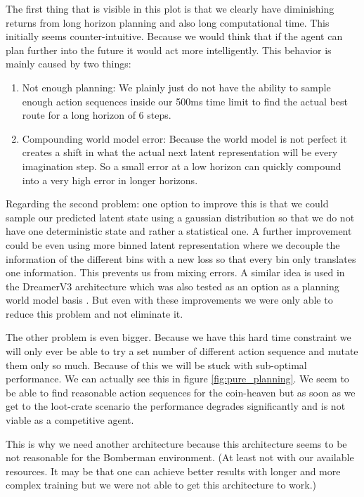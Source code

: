 The first thing that is visible in this plot is that we clearly have diminishing returns from long horizon planning and also long computational time. This initially seems counter-intuitive. Because we would think that if the agent can plan further into the future it would act more intelligently. 
This behavior is mainly caused by two things: 

\begin{enumerate}
    \item Not enough planning: We plainly just do not have the ability to sample enough action sequences inside our 500ms time limit to find the actual best route for a long horizon of 6 steps.
    \item Compounding world model error: Because the world model is not perfect it creates a shift in what the actual next latent representation will be every imagination step. So a small error at a low horizon can quickly compound into a very high error in longer horizons.
\end{enumerate}

Regarding the second problem: one option to improve this is that we could sample our predicted latent state using a gaussian distribution so that we do not have one deterministic state and rather a statistical one. A further improvement could be even using more binned latent representation where we decouple the information of the different bins with a new loss so that every bin only translates one information. This prevents us from mixing errors. A similar idea is used in the DreamerV3 architecture which was also tested as an option as a planning world model basis \cite{hafner2023dreamerv3}. But even with these improvements we were only able to reduce this problem and not eliminate it.

The other problem is even bigger. Because we have this hard time constraint we will only ever be able to try a set number of different action sequence and mutate them only so much. Because of this we will be stuck with sub-optimal performance. We can actually see this in figure \ref{fig:pure_planning}. We seem to be able to find reasonable action sequences for the coin-heaven but as soon as we get to the loot-crate scenario the performance degrades significantly and is not viable as a competitive agent.

This is why we need another architecture because this architecture seems to be not reasonable for the Bomberman environment. (At least not with our available resources. It may be that one can achieve better results with longer and more complex training but we were not able to get this architecture to work.)

